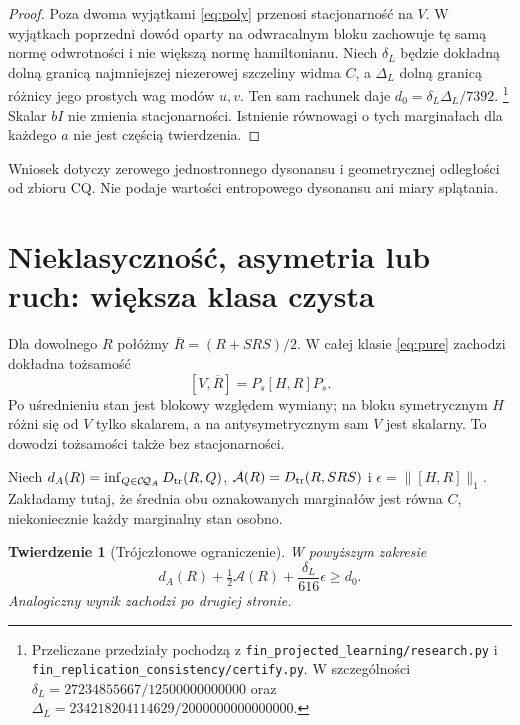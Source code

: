 \documentclass[11pt,a4paper]{article}
\newtheorem{theorem}{Twierdzenie}
\newcommand{\Dtr}{D_{\rm tr}}
\newcommand{\CQ}{\mathcal C\!\mathcal Q}
\begin{document}
\begin{proof}
Poza dwoma wyjątkami \eqref{eq:poly} przenosi stacjonarność na $V$.
W wyjątkach poprzedni dowód oparty na odwracalnym bloku zachowuje
tę samą normę odwrotności i nie większą normę hamiltonianu.
Niech $\delta_L$ będzie dokładną dolną granicą najmniejszej niezerowej
szczeliny widma $C$, a $\Delta_L$ dolną granicą różnicy jego prostych
wag modów $u,v$. Ten sam rachunek daje
$d_0=\delta_L\Delta_L/7392$.
\footnote{Przeliczane przedziały pochodzą z
\texttt{fin\_projected\_learning/research.py} i
\texttt{fin\_replication\_consistency/certify.py}.
W szczególności $\delta_L=27234855667/12500000000000$ oraz
$\Delta_L=234218204114629/2000000000000000$.}
Skalar $bI$ nie zmienia stacjonarności. Istnienie równowagi o tych
marginałach dla każdego $a$ nie jest częścią twierdzenia.
\end{proof}

Wniosek dotyczy zerowego jednostronnego dysonansu i geometrycznej
odległości od zbioru CQ. Nie podaje wartości entropowego dysonansu
ani miary splątania.

\section{Nieklasyczność, asymetria lub ruch: większa klasa czysta}

Dla dowolnego $R$ połóżmy $\overline R=(R+SRS)/2$.
W całej klasie \eqref{eq:pure} zachodzi dokładna tożsamość
\begin{equation}\label{eq:twirlidentity}
 [V,\overline R]=P_s[H,R]P_s.
\end{equation}
Po uśrednieniu stan jest blokowy względem wymiany; na bloku
symetrycznym $H$ różni się od $V$ tylko skalarem, a na
antysymetrycznym sam $V$ jest skalarny. To dowodzi tożsamości
także bez stacjonarności.

Niech $d_A(R)=\inf_{Q\in\CQ_A}\Dtr(R,Q)$,
$\mathcal A(R)=\Dtr(R,SRS)$ i $\epsilon=\|[H,R]\|_1$.
Zakładamy tutaj, że średnia obu oznakowanych marginałów jest równa $C$,
niekoniecznie każdy marginalny stan osobno.
\begin{theorem}[Trójczłonowe ograniczenie]\label{thm:tradeoff}
W powyższym zakresie
\begin{equation}\label{eq:tradeoff}
 d_A(R)+\tfrac12\mathcal A(R)
       +\frac{\delta_L}{616}\epsilon\ge d_0.
\end{equation}
Analogiczny wynik zachodzi po drugiej stronie.
\end{theorem}
\end{document}

